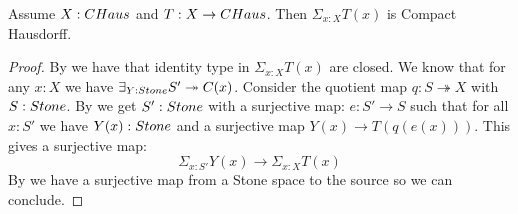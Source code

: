 \begin{lemma}
Assume $X:\CHaus$ and $T:X\to \CHaus$. Then $\Sigma_{x:X}T(x)$ is Compact Hausdorff.
\end{lemma}

\begin{proof}
By  we have that identity type in $\Sigma_{x:X}T(x)$ are closed.
%
We know that for any $x:X$ we have $\exists_{Y:\Stone} S'\twoheadrightarrow C(x)$. 
Consider the quotient map $q:S \twoheadrightarrow  X$ with $S:\Stone$. 
By  we get $S':\Stone$ with a surjective map: $e:S'\to S$
such that for all $x:S'$ we have $Y(x):\Stone$ and a surjective map $Y(x)\to T(q(e(x)))$. 
This gives a surjective map:
$$ \Sigma_{x:S'}Y(x)\to \Sigma_{x:X}T(x)$$
By  we have a surjective map from a Stone space to the source so we can conclude.
\end{proof}
